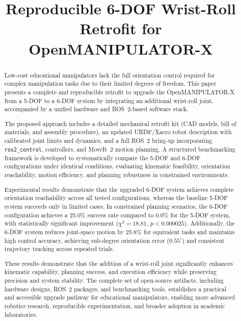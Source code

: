\documentclass[conference]{IEEEtran}
\title{Reproducible 6-DOF Wrist-Roll Retrofit for OpenMANIPULATOR-X}
\author{
	\IEEEauthorblockA{
		CSE/ROBOTICS\\
		TELEPARADIGM TOWERS\\
		HYDERABAD, INDIA\\
		email@domain.com}
}
\begin{document}
	
	\maketitle
	
	\begin{abstract}
		Low-cost educational manipulators lack the full orientation control
		required for complex manipulation tasks due to their limited degrees
		of freedom. This paper presents a complete and reproducible retrofit
		to upgrade the OpenMANIPULATOR-X from a 5-DOF to a
		6-DOF system by integrating an additional wrist-roll joint, accompanied
		by a unified hardware and ROS~2-based software stack.
		
		The proposed approach includes a detailed mechanical retrofit kit
		(CAD models, bill of materials, and assembly procedure), an updated
		URDF/Xacro robot description with calibrated joint limits and
		dynamics, and a full ROS~2 bring-up incorporating
		\texttt{ros2\_control}, controllers, and MoveIt~2 motion planning.
		A structured benchmarking framework is developed to systematically
		compare the 5-DOF and 6-DOF configurations under identical
		conditions, evaluating kinematic feasibility, orientation
		reachability, motion efficiency, and planning robustness in
		constrained environments.
		
		Experimental results demonstrate that the upgraded 6-DOF system
		achieves complete orientation reachability across all tested
		configurations, whereas the baseline 5-DOF system succeeds only
		in limited cases. In constrained planning scenarios, the 6-DOF
		configuration achieves a 25.0\% success rate compared to 0.0\%
		for the 5-DOF system, with statistically significant improvement
		($\chi^2 = 18.81$, $p < 0.000025$). Additionally, the 6-DOF
		system reduces joint-space motion by 25.8\% for equivalent tasks
		and maintains high control accuracy, achieving sub-degree
		orientation error ($0.55^\circ$) and consistent trajectory
		tracking across repeated trials.
		
		These results demonstrate that the addition of a wrist-roll joint
		significantly enhances kinematic capability, planning success, and
		execution efficiency while preserving precision and system
		stability. The complete set of open-source artifacts, including
		hardware designs, ROS~2 packages, and benchmarking tools,
		establishes a practical and accessible upgrade pathway for
		educational manipulators, enabling more advanced robotics
		research, reproducible experimentation, and broader adoption in
		academic laboratories.
	\end{abstract}
	
\end{document}
